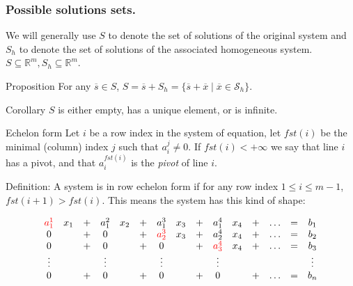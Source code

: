 \documentclass{beamer}
\begin{document}
\begin{frame}
  \frametitle{Possible solutions sets.}

  We will generally use $S$ to denote the set of solutions of the original system and $S_h$ to denote the set of solutions of the associated homogeneous system. $S \subseteq \mathbb{R}^m, S_h \subseteq \mathbb{R}^m$.
  
  \begin{block}{Proposition}
    For any $\overline{s} \in S$, $S = \overline{s} + S_h =  \{ \overline s + \overline x \mid \overline x \in \mathcal{S}_{h}  \}$.
  \end{block}

  \begin{block}{Corollary}
    $S$ is either empty, has a unique element, or is infinite.
  \end{block}
  
\end{frame}

\begin{frame}{Echelon form}
  Let $i$ be a row index in the system of equation, let $fst(i)$ be the minimal (column) index $j$ such that $a^j_i \neq 0$. {\color{blue} If $fst(i) < +\infty$ we say that line $i$ has a pivot, and that $a^{fst(i)}_i$ is the \emph{pivot} of line $i$.}
  \begin{block}{Definition:}
    A system is in row echelon form if for any row index $1 \le i \le m-1$, $fst(i+1) > fst(i)$. This means the system has this kind of shape:

    \[ \begin{array}{ccccccccccccccc}
      {\color{red} a^1_1} & x_1 & + & a^2_1       & x_2 & + & a^3_1       & x_3 & + & a^4_1       & x_4 & + & \dots & = & b_1 \\
      0     &     & + & 0          &      & + & {\color{red}a^3_{2}} & x_3 & + & a^4_2       & x_4 & + & \dots & = & b_2\\
      0     &     & + & 0          &      & + & 0           &     & + & {\color{red}a^4_{3}} & x_4 & + & \dots & = & b_3\\
      \vdots&     &   & \vdots     &     &   & \vdots      &     &   & \vdots     &     &   &       &   & \vdots\\
      0     &     & + & 0          &     & + & 0           &     & + & 0          &     & + & \dots & = & b_n\\
    \end{array}
    \]
    
    
  \end{block}
\end{frame}
\end{document}
